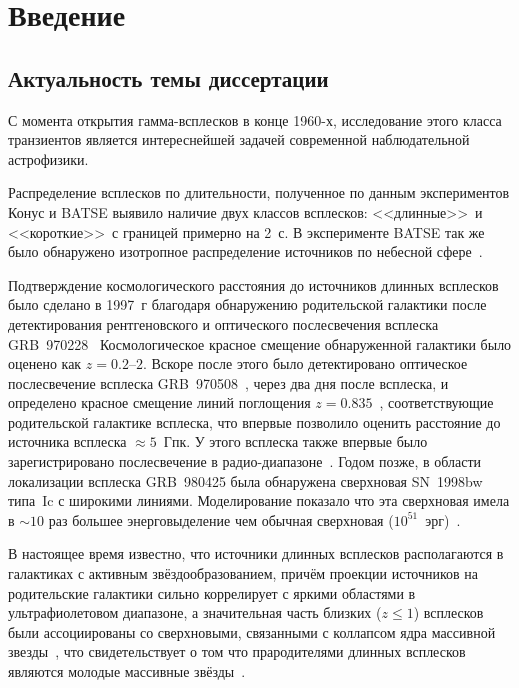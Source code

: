 \chapter{Введение}					
	
\section{Актуальность темы диссертации}
С момента открытия гамма-всплесков в конце 1960-х, исследование этого класса транзиентов
является интереснейшей задачей современной наблюдательной астрофизики.

Распределение всплесков по длительности, полученное по данным экспериментов 
Конус и BATSE выявило наличие двух классов всплесков: <<длинные>>\ и <<короткие>>\ 
с границей примерно на 2~с. В эксперименте BATSE так же было обнаружено изотропное 
распределение источников по небесной сфере~\citep{Mazets_1981_part_1,Briggs_1993ApJ}.  

Подтверждение космологического расстояния до источников длинных всплесков 
было сделано в 1997~г благодаря обнаружению родительской галактики после детектирования 
рентгеновского и оптического послесвечения всплеска GRB~970228~\citep{Costa1997Natur, van_Paradijs_1997Natur} 
Космологическое красное смещение обнаруженной галактики было оценено как $z=0.2\textrm{--}2$.
Вскоре после этого было детектировано оптическое послесвечение всплеска 
GRB~970508~\citep{Djorgovski1997Natur}, через два дня после всплеска, и определено красное смещение линий 
поглощения $z=0.835$~\citep{Metzger_1997Natur, Reichart_1998ApJ}, соответствующие родительской галактике 
всплеска, что впервые позволило оценить расстояние до источника всплеска $\approx 5$~Гпк. 
У этого всплеска также впервые было зарегистрировано послесвечение в радио-диапазоне~\citep{Frail_1997Natur}.
Годом позже, в области локализации всплеска GRB~980425 была обнаружена сверхновая 
SN~1998bw типа~Ic с широкими линиями. Моделирование показало что эта сверхновая 
имела в $\sim 10$ раз большее энерговыделение чем обычная 
сверхновая ($10^{51}$~эрг)~\citep{Hjorth_and_Bloom_2012in_book}.

В настоящее время известно, что источники длинных всплесков располагаются в галактиках 
с активным звёздообразованием, причём проекции источников на родительские галактики сильно
коррелирует с яркими областями в ультрафиолетовом диапазоне, а значительная часть 
близких ($z \le 1$) всплесков были ассоциированы со сверхновыми, связанными с 
коллапсом ядра массивной звезды~\citep{Hjorth_and_Bloom_2012in_book},
что свидетельствует о том что прародителями длинных всплесков являются молодые 
массивные звёзды~\citep[см. обзор][]{Berger_2014}.

